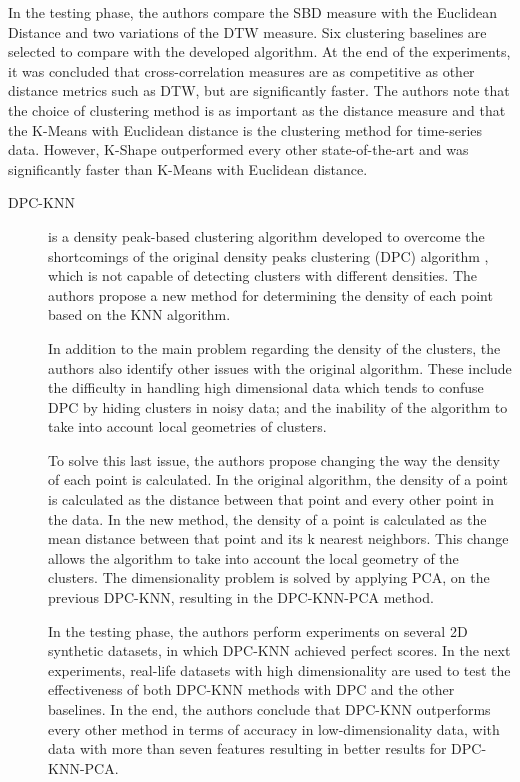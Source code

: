 \begin{description}
    In the testing phase, the authors compare the SBD measure with the Euclidean Distance and two variations of the DTW measure. Six clustering baselines are selected to compare with the developed algorithm. At the end of the experiments, it was concluded that cross-correlation measures are as competitive as other distance metrics such as DTW, but are significantly faster. The authors note that the choice of clustering method is as important as the distance measure and that the K-Means with Euclidean distance is the clustering method for time-series data. However, K-Shape outperformed every other state-of-the-art and was significantly faster than K-Means with Euclidean distance.
\end{description}

\begin{description}
    \item[DPC-KNN]\cite{Du.Ding.ea_Studydensitypeaks_2016} is a density peak-based clustering algorithm developed to overcome the shortcomings of the original density peaks clustering (DPC) algorithm \cite{Rodriguez.Laio_Clusteringfastsearch_2014}, which is not capable of detecting clusters with different densities. The authors propose a new method for determining the density of each point based on the KNN algorithm. 
    
    In addition to the main problem regarding the density of the clusters, the authors also identify other issues with the original algorithm. These include the difficulty in handling high dimensional data which tends to confuse DPC by hiding clusters in noisy data; and the inability of the algorithm to take into account local geometries of clusters. 
    
    To solve this last issue, the authors propose changing the way the density of each point is calculated. In the original algorithm, the density of a point is calculated as the distance between that point and every other point in the data. In the new method, the density of a point is calculated as the mean distance between that point and its k nearest neighbors. This change allows the algorithm to take into account the local geometry of the clusters. The dimensionality problem is solved by applying PCA, on the previous DPC-KNN, resulting in the DPC-KNN-PCA method.

    In the testing phase, the authors perform experiments on several 2D synthetic datasets, in which DPC-KNN achieved perfect scores. In the next experiments, real-life datasets with high dimensionality are used to test the effectiveness of both DPC-KNN methods with DPC and the other baselines. In the end, the authors conclude that DPC-KNN outperforms every other method in terms of accuracy in low-dimensionality data, with data with more than seven features resulting in better results for DPC-KNN-PCA.
\end{description}

